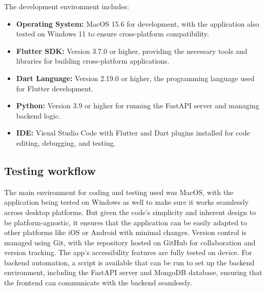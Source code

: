 \documentclass[openany]{book}
\begin{document}
The development environment includes:
\begin{itemize}
    \item \textbf{Operating System:} MacOS 15.6 for development, with the application also tested on Windows 11 to ensure cross-platform compatibility.
    \item \textbf{Flutter SDK:} Version 3.7.0 or higher, providing the necessary tools and libraries for building cross-platform applications.
    \item \textbf{Dart Language:} Version 2.19.0 or higher, the programming language used for Flutter development.
    \item \textbf{Python:} Version 3.9 or higher for running the FastAPI server and managing backend logic.
    \item \textbf{IDE:} Visual Studio Code with Flutter and Dart plugins installed for code editing, debugging, and testing.
\end{itemize}

\subsection{Testing workflow}
The main environment for coding and testing used was MacOS, with the application being tested on Windows as well to make sure it works seamlessly across desktop platforms. But given the code's simplicity and inherent design to be platform-agnostic, it ensures that the application can be easily adapted to other platforms like iOS or Android with minimal changes. Version control is managed using Git, with the repository hosted on GitHub for collaboration and version tracking. The app's accessibility features are fully tested on device. For backend automation, a script is available that can be run to set up the backend environment, including the FastAPI server and MongoDB database, ensuring that the frontend can communicate with the backend seamlessly.
\end{document}
